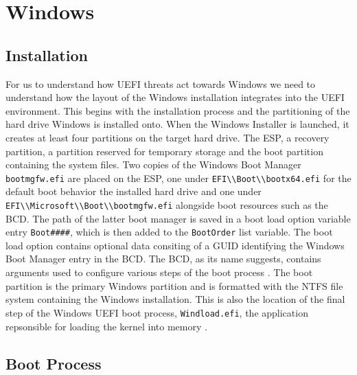 
\section{Windows}



\subsection{Installation}

For us to understand how UEFI threats act towards Windows we need to understand how the layout of the Windows installation integrates into the UEFI environment.
This begins with the installation process and the partitioning of the hard drive Windows is installed onto.
When the Windows Installer is launched, it creates at least four partitions on the target hard drive.
The \acf{ESP}, a recovery partition, a partition reserved for temporary storage and the boot partition containing the system files.
Two copies of the Windows Boot Manager \lstinline{bootmgfw.efi} are placed on the \ac{ESP}, one under \lstinline{EFI\\Boot\\bootx64.efi} for the default boot behavior the installed hard drive and one under \lstinline{EFI\\Microsoft\\Boot\\bootmgfw.efi} alongside boot resources such as the \ac{BCD}.
The path of the latter boot manager is saved in a boot load option variable entry \lstinline{Boot####}, which is then added to the \lstinline{BootOrder} list variable.
The boot load option contains optional data consiting of a GUID identifying the Windows Boot Manager entry in the \ac{BCD}.
The \ac{BCD}, as its name suggests, contains arguments used to configure various steps of the boot process \cite[12. The Windows Boot Manager]{windows-internals-7-part2}.
The boot partition is the primary Windows partition and is formatted with the \ac{NTFS} file system containing the Windows installation.
This is also the location of the final step of the Windows UEFI boot process, \lstinline{Windload.efi}, the application repsonsible for loading the kernel into memory \cite[12. The Windows OS Loader]{windows-internals-7-part2}.

\subsection{Boot Process}

